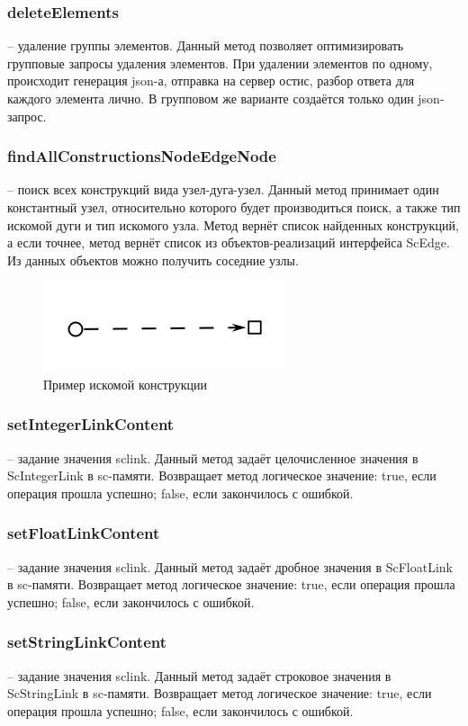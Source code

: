 \subsubsection {deleteElements} -- удаление группы элементов. Данный метод позволяет оптимизировать групповые запросы удаления элементов. При удалении элементов по одному, происходит генерация json-а, отправка на сервер остис, разбор ответа для каждого элемента лично. В групповом же варианте создаётся только один json-запрос. 
\subsubsection {findAllConstructionsNodeEdgeNode} -- поиск всех конструкций вида узел-дуга-узел. Данный метод принимает один константный узел, относительно которого будет производиться поиск, а также тип искомой дуги и тип искомого узла. Метод вернёт список найденных конструкций, а если точнее, метод вернёт список из объектов-реализаций интерфейса ScEdge. Из данных объектов можно получить соседние узлы. 
\begin{figure}[H]
    \centering
    \includegraphics{images/sc-context/node-edge-node.png}
    \caption{Пример искомой конструкции}
    \label{json_ex}
\end{figure}

\subsubsection {setIntegerLinkContent} -- задание значения sclink. Данный метод задаёт целочисленное значения в ScIntegerLink в sc-памяти. Возвращает метод логическое значение: true, если операция прошла успешно; false, если закончилось с ошибкой. 
\subsubsection {setFloatLinkContent} -- задание значения sclink. Данный метод задаёт дробное значения в ScFloatLink в sc-памяти. Возвращает метод логическое значение: true, если операция прошла успешно; false, если закончилось с ошибкой. 
\subsubsection {setStringLinkContent} -- задание значения sclink. Данный метод задаёт строковое значения в ScStringLink в sc-памяти. Возвращает метод логическое значение: true, если операция прошла успешно; false, если закончилось с ошибкой. 
